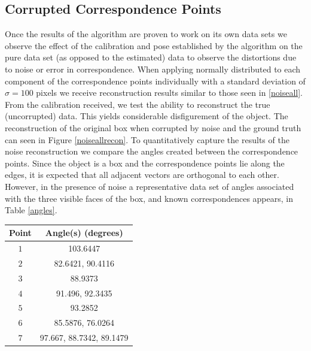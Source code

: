 \documentclass[12pt]{article}
\begin{document}
\subsection{Corrupted Correspondence Points}
 Once the results of the algorithm are proven to work on its own data sets we observe the effect of the calibration and pose established by the algorithm on the pure data set (as opposed to the estimated) data to observe the distortions due to noise or error in correspondence. When applying normally distributed to each component of the correspondence points individually with a standard deviation of $\sigma = 100$ pixels we receive reconstruction results similar to those seen in \ref{noiseall}. From the calibration received, we test the ability to reconstruct the true (uncorrupted) data. This yields considerable disfigurement of the object. The reconstruction of the original box when corrupted by noise and the ground truth can seen in Figure \ref{noiseallrecon}.  To quantitatively capture the results of the noise reconstruction we compare the angles created between the correspondence points. Since the object is a box and the correspondence points lie along the edges, it is expected that all adjacent vectors are orthogonal to each other. However, in the presence of noise a representative data set of angles associated with the three visible faces of the box, and known correspondences appears, in Table \ref{angles}.
	\begin{center}
	\begin{tabular}[5pt]{| c| c|}
		\hline
		Point	& Angle(s) (degrees) \\[0.5ex] 
		\hline 	
		$1$& 103.6447 \\ \hline 
		$2$& 82.6421, 90.4116  \\ \hline 
		$3$& 88.9373  \\ \hline 
		$4$& 91.496, 92.3435  \\ \hline 
		$5$& 93.2852  \\ \hline 
		$6$& 85.5876, 76.0264  \\ \hline 
		$7$& 97.667, 88.7342, 89.1479  \\ \hline 
	\end{tabular}
	\label{angles}
\end{center}	
\end{document}

